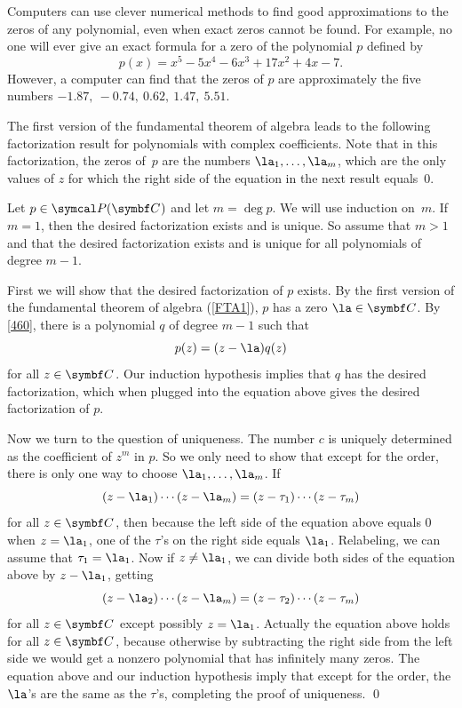 Computers can use clever numerical methods to find good approximations to the zeros of any polynomial, even when exact zeros cannot be found. For example, no one will ever give an exact formula for a zero of the polynomial $p$ defined by
\[
p(x) = x^5 - 5 x^4 - 6 x^3 + 17 x^2 + 4 x -7.
\]
However, a computer can find that the zeros of $p$ are approximately the five numbers
$
-1.87,\ -0.74,\ 0.62,\ 1.47,\ 5.51$.

The first version of the fundamental theorem of algebra leads to the following factorization
result for polynomials with complex coefficients.  Note that in this
factorization, the zeros of~$p$ are the numbers $\la_1, \dots, \la_m$,
which are the only values of $z$ for which the right side of the equation in the next result equals~$0$.


\proof
Let $p \in \P(\C{})$ and let $m = \deg p$.  We will use induction
on~$m$.  If $m = 1$, then the desired factorization exists and is unique.
So assume that $m > 1$ and that the desired factorization exists and is unique
for all polynomials of degree $m-1$.

First we will show that the desired factorization of $p$ exists.  By the
first version of the fundamental theorem of algebra (\ref{FTA1}), $p$ has a zero $\la \in \C{}$.  By
\ref{460}, there is a polynomial $q$ of degree $m-1$ such that
\[
p(z) = (z - \la) q(z)
\]
for all $z \in \C{}$.  Our induction hypothesis implies that $q$ has the desired factorization, which when  plugged into the equation above gives the desired factorization of $p$.

Now we turn to the question of uniqueness.  The number $c$ is uniquely determined as the coefficient of $z^m$ in $p$.  So we only need
to show that except for the order, there is only one way to choose $\la_1, \dots, \la_m$. If
\[
(z - \la_1) \dotsm (z - \la_m) =
(z - \tau_1) \dotsm (z - \tau_m)
\]
for all $z \in \C{}$, then because the left side of the equation above equals $0$ when $z = \la_1$, one of the $\tau$'s on the right side equals $\la_1$. Relabeling, we can assume that $\tau_1 = \la_1$.  Now if $z  \ne \la_1$, we can divide both sides of the equation above by $z - \la_1$, getting
\vspace{-.04in}
\[
(z - \la_2) \dotsm (z - \la_m) =
(z - \tau_2) \dotsm (z - \tau_m)
\]
for all $z \in \C{}$ except possibly $z = \la_1$.  Actually the equation above holds for all $z \in \C{}$, because otherwise by subtracting the right side from the left side we would get a nonzero polynomial that has infinitely many zeros.  The equation above and our induction hypothesis imply that except for the order, the $\la$'s are the same as the $\tau$'s, completing the proof of uniqueness.
\qed

